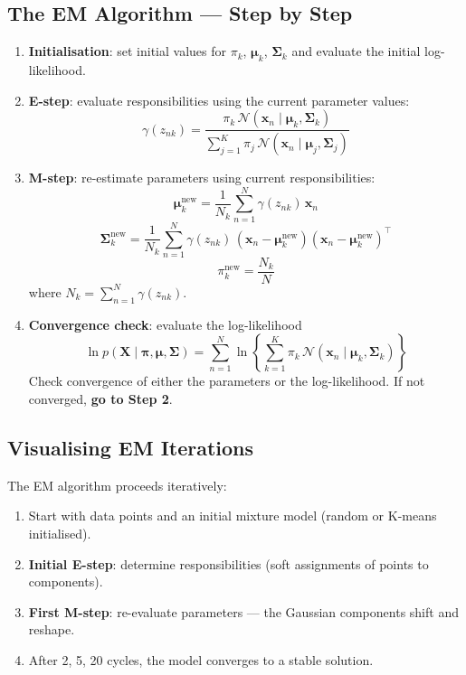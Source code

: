\documentclass[11pt,a4paper]{article}
\theoremstyle{definition}
\theoremstyle{plain}
\theoremstyle{remark}
\begin{document}
\subsection{The EM Algorithm --- Step by Step}

\begin{tcolorbox}[colback=cyan!5!white,colframe=cyan!75!black,title=\textbf{EM Algorithm for GMM}]
\begin{enumerate}
    \item \textbf{Initialisation}: set initial values for $\pi_k$, $\boldsymbol{\mu}_k$, $\boldsymbol{\Sigma}_k$ and evaluate the initial log-likelihood.

    \item \textbf{E-step}: evaluate responsibilities using the current parameter values:
    \[
    \gamma(z_{nk}) = \frac{\pi_k \, \mathcal{N}(\mathbf{x}_n \mid \boldsymbol{\mu}_k, \boldsymbol{\Sigma}_k)}{\displaystyle\sum_{j=1}^{K} \pi_j \, \mathcal{N}(\mathbf{x}_n \mid \boldsymbol{\mu}_j, \boldsymbol{\Sigma}_j)}
    \]

    \item \textbf{M-step}: re-estimate parameters using current responsibilities:
    \[
    \boldsymbol{\mu}_k^{\text{new}} = \frac{1}{N_k} \sum_{n=1}^{N} \gamma(z_{nk}) \, \mathbf{x}_n
    \]
    \[
    \boldsymbol{\Sigma}_k^{\text{new}} = \frac{1}{N_k} \sum_{n=1}^{N} \gamma(z_{nk}) \, (\mathbf{x}_n - \boldsymbol{\mu}_k^{\text{new}})(\mathbf{x}_n - \boldsymbol{\mu}_k^{\text{new}})^\top
    \]
    \[
    \pi_k^{\text{new}} = \frac{N_k}{N}
    \]
    where $N_k = \sum_{n=1}^{N} \gamma(z_{nk})$.

    \item \textbf{Convergence check}: evaluate the log-likelihood
    \[
    \ln p(\mathbf{X} \mid \boldsymbol{\pi}, \boldsymbol{\mu}, \boldsymbol{\Sigma}) = \sum_{n=1}^{N} \ln \left\{ \sum_{k=1}^{K} \pi_k \, \mathcal{N}(\mathbf{x}_n \mid \boldsymbol{\mu}_k, \boldsymbol{\Sigma}_k) \right\}
    \]
    Check convergence of either the parameters or the log-likelihood. If not converged, \textbf{go to Step 2}.
\end{enumerate}
\end{tcolorbox}

\subsection{Visualising EM Iterations}

The EM algorithm proceeds iteratively:
\begin{enumerate}
    \item Start with data points and an initial mixture model (random or K-means initialised).
    \item \textbf{Initial E-step}: determine responsibilities (soft assignments of points to components).
    \item \textbf{First M-step}: re-evaluate parameters --- the Gaussian components shift and reshape.
    \item After 2, 5, 20 cycles, the model converges to a stable solution.
\end{enumerate}
\end{document}
